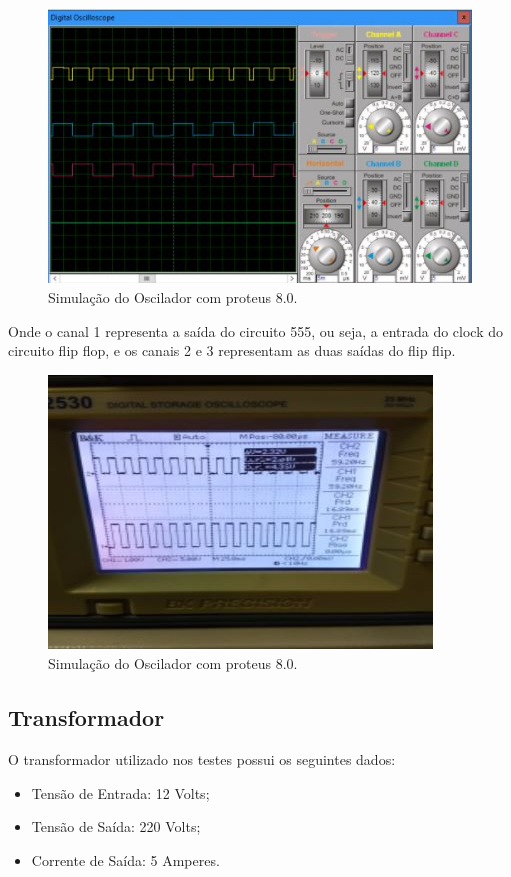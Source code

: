\begin{figure}[H]
	\begin{center}
		\includegraphics[scale = 0.75]{figuras/Simulacao_FlipFlop.JPG}
		\caption{ Simulação do Oscilador com proteus 8.0.}
	\end{center}
\end{figure}

Onde o canal 1 representa a saída do circuito 555, ou seja, a entrada do clock do circuito flip flop, e os canais 2 e 3 representam as duas saídas do flip flip.
\begin{figure}[H]
	\begin{center}
		\includegraphics[scale = 0.75]{figuras/FlipFLop.JPG}
		\caption{ Simulação do Oscilador com proteus 8.0.}
	\end{center}
\end{figure}

\subsection{Transformador}
O transformador utilizado nos testes possui os seguintes dados:
\begin{itemize}
	\item Tensão de Entrada: 12 Volts;
	\item Tensão de Saída: 220 Volts;
	\item Corrente de Saída: 5 Amperes.
	\end{itemize}
	
